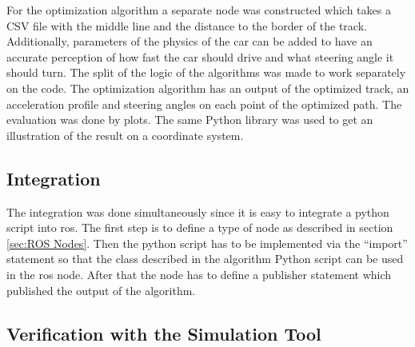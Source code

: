 For the optimization algorithm a separate node was constructed which takes a CSV file with the middle line and the distance to the border of the track. Additionally, parameters of the physics of the car can be added to have an accurate perception of how fast the car should drive and what steering angle it should turn. The split of the logic of the algorithms was made to work separately on the code. The optimization algorithm has an output of the optimized track, an acceleration profile and steering angles on each point of the optimized path. The evaluation was done by plots. The same Python library was used to get an illustration of the result on a coordinate system.

\subsection{Integration} \label{sec:Integration}
The integration was done simultaneously since it is easy to integrate a python script into \acrshort{ros}. The first step is to define a type of node as described in section \ref{sec:ROS Nodes}. Then the python script has to be implemented via the ``import'' statement so that the class described in the algorithm Python script can be used in the \acrshort{ros} node. After that the node has to define a publisher statement which published the output of the algorithm. 

\subsection{Verification with the Simulation Tool} \label{sec:Verification with the Simulation Tool}


